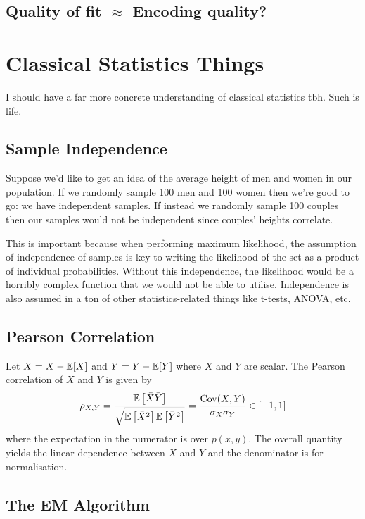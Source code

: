 \documentclass[11pt]{article}
\begin{document}
\begin{appendices}
\subsection{Quality of fit $\approx$ Encoding quality?}

\section{Classical Statistics Things}
I should have a far more concrete understanding of classical statistics tbh. Such is life.

\subsection{Sample Independence}
Suppose we'd like to get an idea of the average height of men and women in our population. If we randomly sample 100 men and 100 women then we're good to go: we have independent samples. If instead we randomly sample 100 couples then our samples would not be independent since couples' heights correlate.

This is important because when performing maximum likelihood, the assumption of independence of samples is key to writing the likelihood of the set as a product of individual probabilities. Without this independence, the likelihood would be a horribly complex function that we would not be able to utilise. Independence is also assumed in a ton of other statistics-related things like t-tests, ANOVA, etc.

\subsection{Pearson Correlation}
\label{app:pearson_correlation}
Let $\bar{X}=X-\mathbb{E}[X]$ and $\bar{Y}=Y-\mathbb{E}[Y]$ where $X$ and $Y$ are scalar. The Pearson correlation of $X$ and $Y$ is given by
$$
\rho_{X,Y}
=
\frac{\mathbb{E}\left[\bar{X}\bar{Y}\right]}{\sqrt{\mathbb{E}\left[\bar{X}^2\right]\mathbb{E}\left[\bar{Y}^2\right]}}
=
\frac{\text{Cov}(X,Y)}{\sigma_X\sigma_Y}
\in[-1,1]
$$
where the expectation in the numerator is over $p(x,y)$. The overall quantity yields the linear dependence between $X$ and $Y$ and the denominator is for normalisation.

\subsection{The EM Algorithm}
\TODO{}


\end{appendices}
\end{document}
